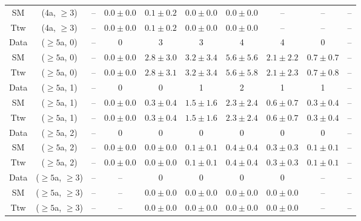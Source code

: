 \begin{table}[h!]
{\begin{tabular}{cccccccccc}
	SM & (4a, $\ge3$) & -- & $0.0\pm 0.0$ & $0.1\pm 0.2$ & $0.0\pm 0.0$ & $0.0\pm 0.0$ & -- & -- & -- \\[0.5ex] 
	Ttw & (4a, $\ge3$) & -- & $0.0\pm 0.0$ & $0.1\pm 0.2$ & $0.0\pm 0.0$ & $0.0\pm 0.0$ & -- & -- & -- \\[0.5ex] 
	Data & ($\ge5$a, 0) & -- & 0 & 3 & 3 & 4 & 4 & 0 & -- \\[0.5ex] 
	SM & ($\ge5$a, 0) & -- & $0.0\pm 0.0$ & $2.8\pm 3.0$ & $3.2\pm 3.4$ & $5.6\pm 5.6$ & $2.1\pm 2.2$ & $0.7\pm 0.7$ & -- \\[0.5ex] 
	Ttw & ($\ge5$a, 0) & -- & $0.0\pm 0.0$ & $2.8\pm 3.1$ & $3.2\pm 3.4$ & $5.6\pm 5.8$ & $2.1\pm 2.3$ & $0.7\pm 0.8$ & -- \\[0.5ex] 
	Data & ($\ge5$a, 1) & -- & 0 & 0 & 1 & 2 & 1 & 1 & -- \\[0.5ex] 
	SM & ($\ge5$a, 1) & -- & $0.0\pm 0.0$ & $0.3\pm 0.4$ & $1.5\pm 1.6$ & $2.3\pm 2.4$ & $0.6\pm 0.7$ & $0.3\pm 0.4$ & -- \\[0.5ex] 
	Ttw & ($\ge5$a, 1) & -- & $0.0\pm 0.0$ & $0.3\pm 0.4$ & $1.5\pm 1.6$ & $2.3\pm 2.4$ & $0.6\pm 0.7$ & $0.3\pm 0.4$ & -- \\[0.5ex] 
	Data & ($\ge5$a, 2) & -- & 0 & 0 & 0 & 0 & 0 & 0 & -- \\[0.5ex] 
	SM & ($\ge5$a, 2) & -- & $0.0\pm 0.0$ & $0.0\pm 0.0$ & $0.1\pm 0.1$ & $0.4\pm 0.4$ & $0.3\pm 0.3$ & $0.1\pm 0.1$ & -- \\[0.5ex] 
	Ttw & ($\ge5$a, 2) & -- & $0.0\pm 0.0$ & $0.0\pm 0.0$ & $0.1\pm 0.1$ & $0.4\pm 0.4$ & $0.3\pm 0.3$ & $0.1\pm 0.1$ & -- \\[0.5ex] 
	Data & ($\ge5$a, $\ge3$) & -- & -- & 0 & 0 & 0 & 0 & -- & -- \\[0.5ex] 
	SM & ($\ge5$a, $\ge3$) & -- & -- & $0.0\pm 0.0$ & $0.0\pm 0.0$ & $0.0\pm 0.0$ & $0.0\pm 0.0$ & -- & -- \\[0.5ex] 
	Ttw & ($\ge5$a, $\ge3$) & -- & -- & $0.0\pm 0.0$ & $0.0\pm 0.0$ & $0.0\pm 0.0$ & $0.0\pm 0.0$ & -- & -- \\[0.5ex] 
	\hline
	\hline
\end{tabular}}
\end{table}
